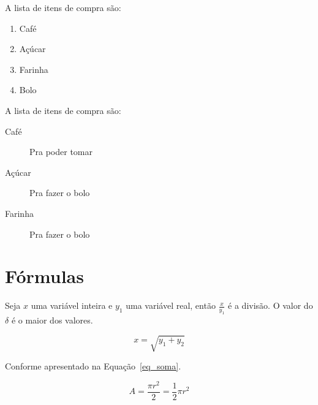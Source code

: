 \documentclass[11pt,twocolumn]{article}
\begin{document}
A lista de itens de compra são: 

\begin{enumerate}
  \item Café
  \item Açúcar
  \item Farinha
  \item Bolo
\end{enumerate}

A lista de itens de compra são: 

\begin{description}
  \item [Café] Pra poder tomar
  \item [Açúcar] Pra fazer o bolo
  \item [Farinha] Pra fazer o bolo
\end{description}

\section{Fórmulas}

Seja $x$ uma variável inteira e $y_1$ uma variável  real, então $\frac{x}{y_1}$ é a divisão. O valor do $\delta$ é o maior dos valores.

$$
x = \sqrt{y_1 + y_2}
$$

Conforme apresentado na Equação~\ref{eq_soma}.

\begin{equation}
\label{eq_soma}
A = \frac{\pi r^2}{2} = \frac{1}{2} \pi r^2 
\end{equation}
\end{document}
